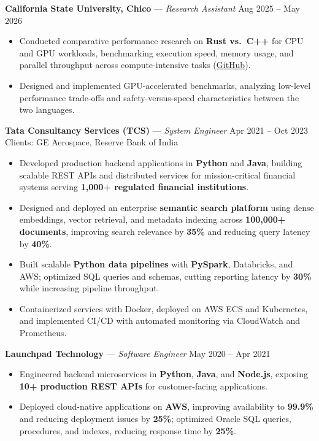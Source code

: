 \documentclass[10pt]{article}
\begin{document}
\textbf{California State University, Chico} --- \textit{Research Assistant} \hfill Aug 2025 -- May 2026
\begin{itemize}
\item Conducted comparative performance research on \textbf{Rust vs.\ C++} for CPU and GPU workloads, benchmarking execution speed, memory usage, and parallel throughput across compute-intensive tasks (\href{https://github.com/adityaanilraut/Rust-vs-Cpp-for-CPU-and-GPU-Performance}{GitHub}).
\item Designed and implemented GPU-accelerated benchmarks, analyzing low-level performance trade-offs and safety-versus-speed characteristics between the two languages.
\end{itemize}

\vspace{3pt}
\textbf{Tata Consultancy Services (TCS)} --- \textit{System Engineer} \hfill Apr 2021 -- Oct 2023 \\
Clients: GE Aerospace, Reserve Bank of India
\begin{itemize}
\item Developed production backend applications in \textbf{Python} and \textbf{Java}, building scalable REST APIs and distributed services for mission-critical financial systems serving \textbf{1,000+ regulated financial institutions}.
\item Designed and deployed an enterprise \textbf{semantic search platform} using dense embeddings, vector retrieval, and metadata indexing across \textbf{100,000+ documents}, improving search relevance by \textbf{35\%} and reducing query latency by \textbf{40\%}.
\item Built scalable \textbf{Python data pipelines} with \textbf{PySpark}, Databricks, and AWS; optimized SQL queries and schemas, cutting reporting latency by \textbf{30\%} while increasing pipeline throughput.
\item Containerized services with Docker, deployed on AWS ECS and Kubernetes, and implemented CI/CD with automated monitoring via CloudWatch and Prometheus.
\end{itemize}

\vspace{3pt}
\textbf{Launchpad Technology} --- \textit{Software Engineer} \hfill May 2020 -- Apr 2021
\begin{itemize}
\item Engineered backend microservices in \textbf{Python}, \textbf{Java}, and \textbf{Node.js}, exposing \textbf{10+ production REST APIs} for customer-facing applications.
\item Deployed cloud-native applications on \textbf{AWS}, improving availability to \textbf{99.9\%} and reducing deployment issues by \textbf{25\%}; optimized Oracle SQL queries, procedures, and indexes, reducing response time by \textbf{25\%}.
\end{itemize}
\end{document}
